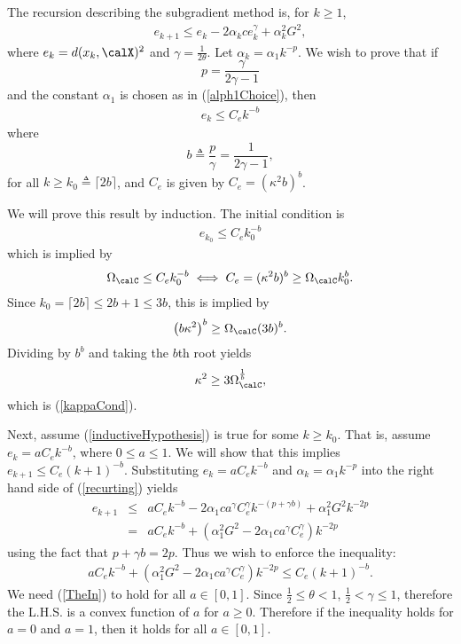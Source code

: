 The recursion describing the subgradient method is, for $k\geq 1$,
\begin{eqnarray}\label{recurting}
e_{k+1}\leq e_k - 2\alpha_k c e_k^{\gamma}+\alpha_k^2 G^2,
\end{eqnarray}
where $e_k=d(x_k,\calX)^2$ and $\gamma=\frac{1}{2\theta}$.
Let $\alpha_k = \alpha_1 k^{-p}$. We wish to prove that if 
$$
p=\frac{\gamma}{2\gamma-1}
$$
and the constant $\alpha_1$ is chosen as in (\ref{alph1Choice}), then
\begin{eqnarray}\label{inductiveHypothesis}
e_k \leq C_e k^{-b}
\end{eqnarray}
 where 
$$b\triangleq\frac{p}{\gamma}=\frac{1}{2\gamma-1},$$ 
for all $k\geq k_0 \triangleq \lceil2 b\rceil$, and $C_e$ is given by $C_e=(\kappa^2 b)^b$.

We will prove this result by induction. The initial condition is
\begin{eqnarray*}
e_{k_0}\leq C_e k_0^{-b}
\end{eqnarray*}
which is implied by
\begin{eqnarray}\label{C_initCond}
\Omega_{\calC}
\leq
C_e k_0^{-b}
\iff
C_e = (\kappa^2 b)^b \geq \Omega_{\calC} k_0^b.
\end{eqnarray}
Since $k_0=\lceil 2b \rceil\leq 2b+1\leq 3b$, this is implied by
\begin{eqnarray*}
\left(
b \kappa^2\right)^{b}
\geq 
\Omega_{\calC}(3b)^b.
\end{eqnarray*}
Dividing by $b^b$ and taking the $b$th root yields 
\begin{eqnarray*}
\kappa^2 \geq 3\Omega_{\calC}^{\frac{1}{b}},
\end{eqnarray*}
which is (\ref{kappaCond}).

Next, assume (\ref{inductiveHypothesis}) is true for some $k\geq k_0$. That is, assume $e_k = a C_e k^{-b}$, where $0\leq a \leq 1$. We will show that this implies $e_{k+1}\leq C_e (k+1)^{-b}$. Substituting $e_k = a C_e k^{-b}$ and $\alpha_k=\alpha_1 k^{-p}$ into the right hand side of (\ref{recurting}) yields
\begin{eqnarray}
e_{k+1}
&\leq&
a C_e k^{-b}-2 \alpha_1 c a^\gamma C_e^\gamma k^{-(p+\gamma b)}+\alpha_1^2 G^2 k^{-2p} 
\nonumber\\\nonumber
&=&
a C_e k^{-b}
+
\left(
\alpha_1^2 G^2
-
2 \alpha_1 c a^\gamma C_e^\gamma
\right)
k^{-2p}
\end{eqnarray}
using the fact that $p+\gamma b=2 p$. Thus we wish to enforce the inequality:
\begin{eqnarray}
\label{TheIn}
a C_e k^{-b}
+
\left(
\alpha_1^2 G^2
-
2 \alpha_1 c a^\gamma C_e^\gamma
\right)
k^{-2p}
\leq
C_e (k+1)^{-b}.
\end{eqnarray}
We need (\ref{TheIn}) to hold for all $a\in[0,1]$. Since $\frac{1}{2}\leq\theta<1$, $\frac{1}{2}<\gamma\leq 1$, therefore the L.H.S. is a convex function of $a$ for $a\geq 0$. Therefore if the inequality holds for $a=0$ and $a=1$, then it holds for all $a\in[0,1]$. 

